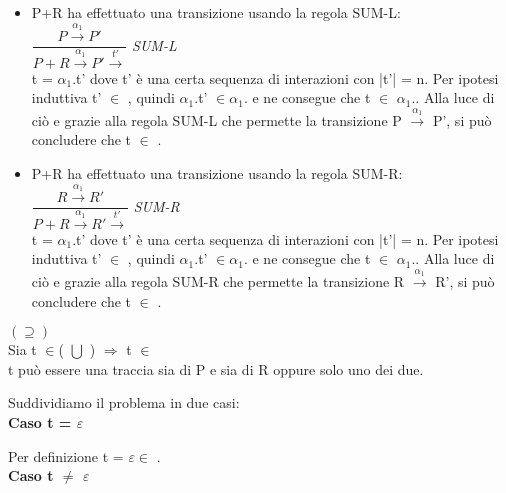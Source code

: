 \begin{itemize}
	\item P+R ha effettuato una transizione usando la regola SUM-L:\\
	
	 	$\dfrac{P \overset{\alpha_{1}}\rightarrow P'}{P + R \overset{\alpha_{1}}\rightarrow P'\overset{t'}\rightarrow}$ \textit{SUM-L} \\
	 	
	 	t = $\alpha_{1}.$t' dove t' è una certa sequenza di interazioni con |t'| = n. Per ipotesi induttiva t' $\in$ , quindi 
	 	$\alpha_{1}.$t' $\in \alpha_{1}.$ e ne consegue che t $\in$ $\alpha_{1}.$. Alla luce di ciò e grazie alla regola SUM-L che permette la transizione P $\overset{\alpha_{1}}\rightarrow $ P', si può concludere che  t $\in$  .
	 	\\
	 	
	 \item P+R ha effettuato una transizione usando la regola SUM-R:\\
	 
	 $\dfrac{R \overset{\alpha_{1}}\rightarrow R'}{P + R \overset{\alpha_{1}}\rightarrow R'\overset{t'}\rightarrow}$ \textit{SUM-R} \\
	 
		t = $\alpha_{1}.$t' dove t' è una certa sequenza di interazioni con |t'| = n. Per ipotesi induttiva t' $\in$ , quindi 
	$\alpha_{1}.$t' $\in \alpha_{1}.$ e ne consegue che t $\in$ $\alpha_{1}.$. Alla luce di ciò e grazie alla regola SUM-R che permette la transizione R $\overset{\alpha_{1}}\rightarrow $ R', si può concludere che  t $\in$  .
	\\
	 	
\end{itemize}

$(\supseteq)$\\

Sia t $\in$( $\bigcup$ ) $\Rightarrow $  t $\in$\\
t può essere una traccia sia di P e sia di R oppure solo uno dei due.

Suddividiamo il problema in due casi:
\\

\textbf{Caso t = $\varepsilon$}

Per definizione t = $\varepsilon \in $ .
\\

\textbf{Caso t $\not=$ $\varepsilon$}

